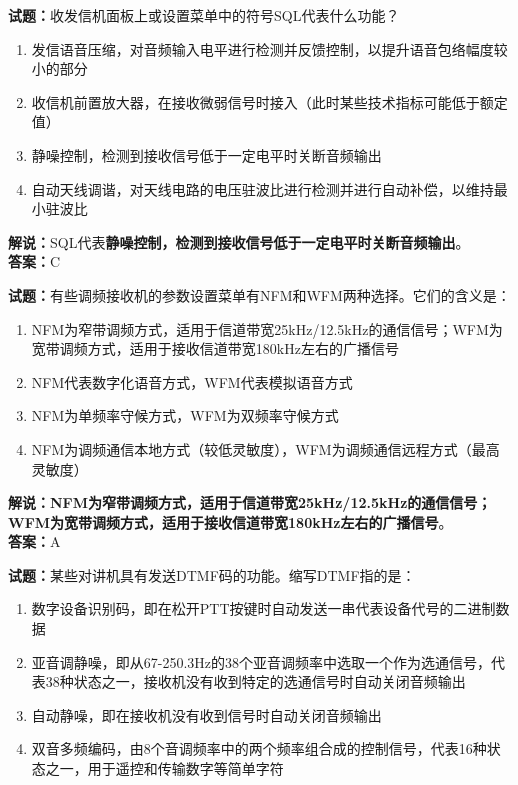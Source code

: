\documentclass{ctexbook}
\begin{document}
\bigskip


\noindent\textbf{试题：}收发信机面板上或设置菜单中的符号SQL代表什么功能？

\begin{enumerate}[leftmargin=3em]
	\item 发信语音压缩，对音频输入电平进行检测并反馈控制，以提升语音包络幅度较小的部分
	\item 收信机前置放大器，在接收微弱信号时接入（此时某些技术指标可能低于额定值）
	\item 静噪控制，检测到接收信号低于一定电平时关断音频输出
	\item 自动天线调谐，对天线电路的电压驻波比进行检测并进行自动补偿，以维持最小驻波比
\end{enumerate}

\noindent\textbf{解说：}SQL代表\textbf{静噪控制，检测到接收信号低于一定电平时关断音频输出}。\\\noindent\textbf{答案：}C


\bigskip


\noindent\textbf{试题：}有些调频接收机的参数设置菜单有NFM和WFM两种选择。它们的含义是：

\begin{enumerate}[leftmargin=3em]
	\item NFM为窄带调频方式，适用于信道带宽25\si{\kHz}/12.5\si{\kHz}的通信信号；WFM为宽带调频方式，适用于接收信道带宽180\si{\kHz}左右的广播信号
	\item NFM代表数字化语音方式，WFM代表模拟语音方式
	\item NFM为单频率守候方式，WFM为双频率守候方式
	\item NFM为调频通信本地方式（较低灵敏度），WFM为调频通信远程方式（最高灵敏度）
\end{enumerate}

\noindent\textbf{解说：NFM为窄带调频方式，适用于信道带宽25\si{\kHz}/12.5\si{\kHz}的通信信号；WFM为宽带调频方式，适用于接收信道带宽180\si{\kHz}左右的广播信号}。\\\noindent\textbf{答案：}A


\bigskip


\noindent\textbf{试题：}某些对讲机具有发送DTMF码的功能。缩写DTMF指的是：

\begin{enumerate}[leftmargin=3em]
	\item 数字设备识别码，即在松开PTT按键时自动发送一串代表设备代号的二进制数据
	\item 亚音调静噪，即从67-250.3Hz的38个亚音调频率中选取一个作为选通信号，代表38种状态之一，接收机没有收到特定的选通信号时自动关闭音频输出
	\item 自动静噪，即在接收机没有收到信号时自动关闭音频输出
	\item 双音多频编码，由8个音调频率中的两个频率组合成的控制信号，代表16种状态之一，用于遥控和传输数字等简单字符
\end{enumerate}
\end{document}
